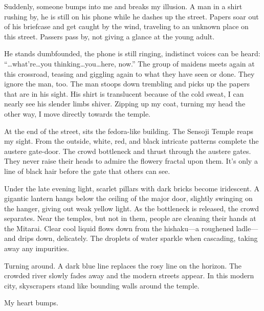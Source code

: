 \documentclass[11pt, oneside]{article}   	%
\begin{document}
Suddenly, someone bumps into me and breaks my illusion. A man in a shirt rushing by, he is still on his phone while he dashes up the street. Papers soar out of his briefcase and get caught by the wind, traveling to an unknown place on this street. Passers pass by, not giving a glance at the young adult. 

He stands dumbfounded, the phone is still ringing, indistinct voices can be heard: “…what’re…you thinking…you…here, now.” The group of maidens meets again at this crossroad, teasing and giggling again to what they have seen or done. They ignore the man, too. The man stoops down trembling and picks up the papers that are in his sight. His shirt is translucent because of the cold sweat, I can nearly see his slender limbs shiver. Zipping up my coat, turning my head the other way, I move directly towards the temple.  

At the end of the street, sits the fedora-like building. The Sensoji Temple reaps my sight. From the outside, white, red, and black intricate patterns complete the austere gate-door. The crowd bottleneck and thrust through the austere gates. They never raise their heads to admire the flowery fractal upon them. It’s only a line of black hair before the gate that others can see. 

Under the late evening light, scarlet pillars with dark bricks become iridescent. A gigantic lantern hangs below the ceiling of the major door, slightly swinging on the hanger, giving out weak yellow light. As the bottleneck is released, the crowd separates. Near the temples, but not in them, people are cleaning their hands at the Mitarai. Clear cool liquid flows down from the hishaku—a roughened ladle—and drips down, delicately. The droplets of water sparkle when cascading, taking away any impurities. 
  
Turning around. A dark blue line replaces the rosy line on the horizon. The crowded river slowly fades away and the modern streets appear. In this modern city, skyscrapers stand like bounding walls around the temple. 
  
My heart bumps.  
\end{document}
